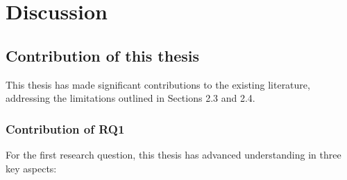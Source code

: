 \chapter{\label{ch:6-discussion}Discussion}

\section{Contribution of this thesis}
This thesis has made significant contributions to the existing literature, addressing the limitations outlined in Sections 2.3 and 2.4.

\subsection{Contribution of RQ1}
For the first research question, this thesis has advanced understanding in three key aspects:

